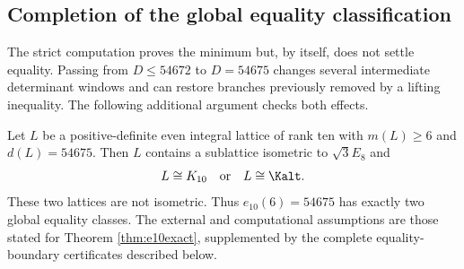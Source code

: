 \subsection{Completion of the global equality classification}\label{subsec:complete10equality}

The strict computation proves the minimum but, by itself, does not settle equality. Passing from $D\le54672$ to $D=54675$ changes several intermediate determinant windows and can restore branches previously removed by a lifting inequality. The following additional argument checks both effects.

\begin{theorem}\label{thm:global10equality}
Let $L$ be a positive-definite even integral lattice of rank ten with $m(L)\ge6$ and $d(L)=54675$. Then $L$ contains a sublattice isometric to $\sqrt3E_8$ and
\[
L\cong K_{10}\quad\text{or}\quad L\cong\Kalt.
\]
These two lattices are not isometric. Thus $e_{10}(6)=54675$ has exactly two global equality classes. The external and computational assumptions are those stated for Theorem \ref{thm:e10exact}, supplemented by the complete equality-boundary certificates described below.
\end{theorem}

